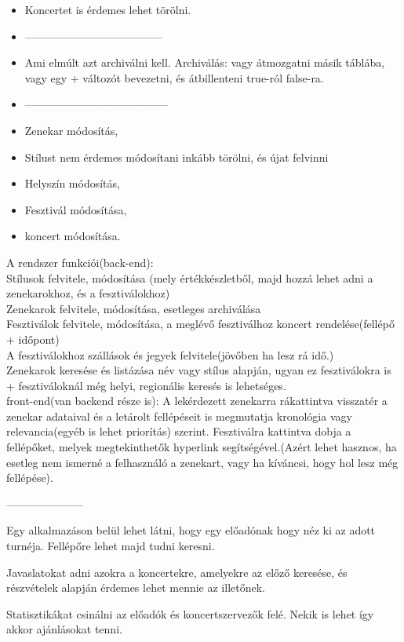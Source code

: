 \documentclass[11pt]{article}
\begin{document}
\begin{itemize}
\item Koncertet is érdemes lehet törölni.
\item --------------------------------------
\item Ami elmúlt azt archiválni kell. Archiválás: vagy átmozgatni másik táblába, vagy egy + változót bevezetni, és átbillenteni true-ról false-ra.
\item ---------------------------------------
\item Zenekar módosítás,
\item Stílust nem érdemes módosítani inkább törölni, és újat felvinni
\item Helyszín módosítás,
\item Fesztivál módosítása, 
\item koncert módosítása.
\end{itemize}

A rendszer funkciói(back-end):\\
Stílusok felvitele, módosítása (mely értékkészletből, majd hozzá lehet adni a zenekarokhoz, és a fesztiválokhoz)\\
Zenekarok felvitele, módosítása, esetleges archiválása\\
Fesztiválok felvitele, módosítása, a meglévő fesztiválhoz koncert rendelése(fellépő + időpont)\\
A fesztiválokhoz szállások és jegyek felvitele(jövőben ha lesz rá idő.)\\
Zenekarok keresése és listázása név vagy stílus alapján, ugyan ez fesztiválokra is + fesztiváloknál még helyi, regionális keresés is lehetséges.\\
front-end(van backend része is):
A lekérdezett zenekarra rákattintva visszatér a zenekar adataival és a letárolt fellépéseit is megmutatja kronológia vagy relevancia(egyéb is lehet priorítás) szerint.
Fesztiválra kattintva dobja a fellépőket, melyek megtekinthetők hyperlink segítségével.(Azért lehet hasznos, ha esetleg nem ismerné a felhasználó a zenekart, vagy ha kíváncsi, hogy hol lesz még fellépése).

---------------------

Egy alkalmazáson belül lehet látni, hogy egy előadónak hogy néz ki az adott turnéja. Fellépőre lehet majd tudni keresni.

Javaslatokat adni azokra a koncertekre, amelyekre az előző keresése, és részvételek alapján érdemes lehet mennie az illetőnek.

Statisztikákat csinálni az előadók és koncertszervezők felé. Nekik is lehet így akkor ajánlásokat tenni.
\end{document}

